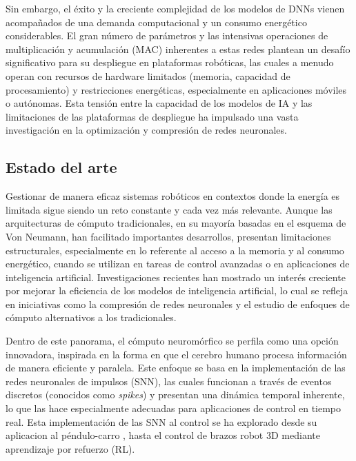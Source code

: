\documentclass[12pt]{article}
\begin{document}
Sin embargo, el éxito y la creciente complejidad de los modelos de DNNs vienen acompañados de una demanda computacional y un consumo energético considerables\cite{Chen2021memristor, deVriesGao2025AIenergy}. El gran número de parámetros y las intensivas operaciones de multiplicación y acumulación (MAC) inherentes a estas redes plantean un desafío significativo para su despliegue en plataformas robóticas, las cuales a menudo operan con recursos de hardware limitados (memoria, capacidad de procesamiento) y restricciones energéticas, especialmente en aplicaciones móviles o autónomas\cite{Bartolozzi2022embodied, Kudithipudi2025scale}. Esta tensión entre la capacidad de los modelos de IA y las limitaciones de las plataformas de despliegue ha impulsado una vasta investigación en la optimización y compresión de redes neuronales.
\subsection{Estado del arte}
Gestionar de manera eficaz sistemas robóticos en contextos donde la energía es limitada sigue siendo un reto constante y cada vez más relevante. Aunque las arquitecturas de cómputo tradicionales, en su mayoría basadas en el esquema de Von Neumann, han facilitado importantes desarrollos, presentan limitaciones estructurales, especialmente en lo referente al acceso a la memoria y al consumo energético, cuando se utilizan en tareas de control avanzadas o en aplicaciones de inteligencia artificial.
Investigaciones recientes han mostrado un interés creciente por mejorar la eficiencia de los modelos de inteligencia artificial, lo cual se refleja en iniciativas como la compresión de redes neuronales y el estudio de enfoques de cómputo alternativos a los tradicionales.

Dentro de este panorama, el cómputo neuromórfico se perfila como una opción innovadora, inspirada en la forma en que el cerebro humano procesa información de manera eficiente y paralela\cite{Mehonic2022}. Este enfoque se basa en la implementación de las redes neuronales de impulsos (SNN), las cuales funcionan a través de eventos discretos (conocidos como \textit{spikes}) y presentan una dinámica temporal inherente, lo que las hace especialmente adecuadas para aplicaciones de control en tiempo real\cite{Zanatta2024exploring, MAASS19971659}.
Esta implementación de las SNN al control se ha explorado desde su aplicacion al péndulo-carro \cite{Vlasov2023}, hasta el control de brazos robot 3D mediante aprendizaje por refuerzo (RL)\cite{Park2025electronics,Zanatta2024exploring}.
\end{document}
